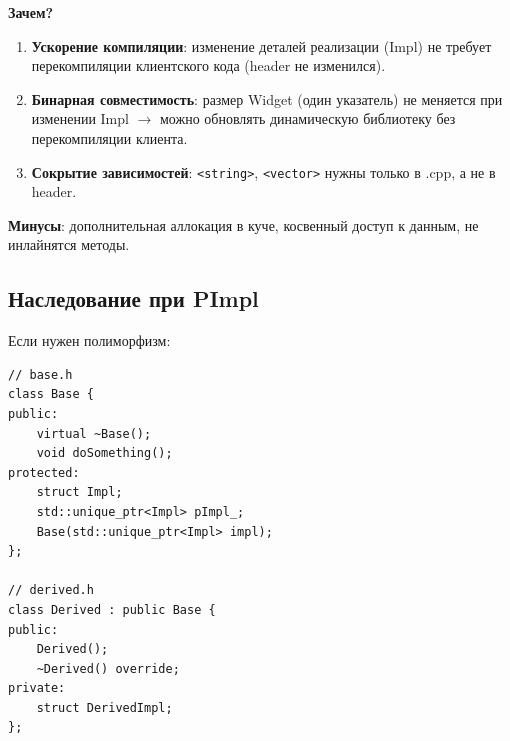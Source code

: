 \documentclass[12pt,a4paper]{article}
\begin{document}
\textbf{Зачем?}
\begin{enumerate}
    \item \textbf{Ускорение компиляции}: изменение деталей реализации (Impl) не требует перекомпиляции клиентского кода (header не изменился).
    \item \textbf{Бинарная совместимость}: размер Widget (один указатель) не меняется при изменении Impl $\to$ можно обновлять динамическую библиотеку без перекомпиляции клиента.
    \item \textbf{Сокрытие зависимостей}: \texttt{<string>}, \texttt{<vector>} нужны только в .cpp, а не в header.
\end{enumerate}

\textbf{Минусы}: дополнительная аллокация в куче, косвенный доступ к данным, не инлайнятся методы.

\subsection{Наследование при PImpl}

Если нужен полиморфизм:
\begin{lstlisting}
// base.h
class Base {
public:
    virtual ~Base();
    void doSomething();
protected:
    struct Impl;
    std::unique_ptr<Impl> pImpl_;
    Base(std::unique_ptr<Impl> impl);
};

// derived.h
class Derived : public Base {
public:
    Derived();
    ~Derived() override;
private:
    struct DerivedImpl;
};
\end{lstlisting}
\end{document}

